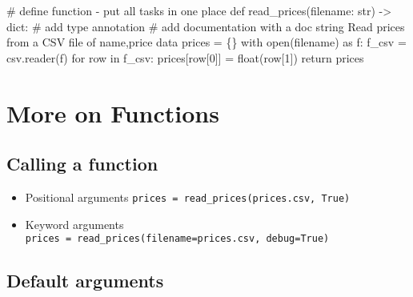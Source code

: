 \documentclass[
  letterpaper,
  DIV=11,
  numbers=noendperiod]{scrreprt}
\newenvironment{Shaded}{\begin{snugshade}}{\end{snugshade}}
\newcommand{\BuiltInTok}[1]{\textcolor[rgb]{0.00,0.46,0.62}{#1}}
\newcommand{\CommentTok}[1]{\textcolor[rgb]{0.37,0.37,0.37}{#1}}
\newcommand{\ControlFlowTok}[1]{\textcolor[rgb]{0.00,0.46,0.62}{#1}}
\newcommand{\DecValTok}[1]{\textcolor[rgb]{0.68,0.00,0.00}{#1}}
\newcommand{\ImportTok}[1]{\textcolor[rgb]{0.00,0.46,0.62}{#1}}
\newcommand{\KeywordTok}[1]{\textcolor[rgb]{0.00,0.46,0.62}{#1}}
\newcommand{\NormalTok}[1]{\textcolor[rgb]{0.00,0.46,0.62}{#1}}
\newcommand{\OperatorTok}[1]{\textcolor[rgb]{0.37,0.37,0.37}{#1}}
\providecommand{\tightlist}{%
  \setlength{\itemsep}{0pt}\setlength{\parskip}{0pt}}
\begin{document}
\begin{Shaded}
\begin{Highlighting}[]
\CommentTok{\# define function {-} put all tasks in one place}
\KeywordTok{def}\NormalTok{ read\_prices(filename: }\BuiltInTok{str}\NormalTok{) }\OperatorTok{{-}\textgreater{}} \BuiltInTok{dict}\NormalTok{: }\CommentTok{\# add type annotation}
    \CommentTok{\# add documentation with a doc string}
    \CommentTok{\textquotesingle{}\textquotesingle{}\textquotesingle{} }
\CommentTok{    Read prices from a CSV file of name,price data}
\CommentTok{    \textquotesingle{}\textquotesingle{}\textquotesingle{}}
\NormalTok{    prices }\OperatorTok{=}\NormalTok{ \{\}}
    \ControlFlowTok{with} \BuiltInTok{open}\NormalTok{(filename) }\ImportTok{as}\NormalTok{ f:}
\NormalTok{        f\_csv }\OperatorTok{=}\NormalTok{ csv.reader(f)}
        \ControlFlowTok{for}\NormalTok{ row }\KeywordTok{in}\NormalTok{ f\_csv:}
\NormalTok{            prices[row[}\DecValTok{0}\NormalTok{]] }\OperatorTok{=} \BuiltInTok{float}\NormalTok{(row[}\DecValTok{1}\NormalTok{])}
    \ControlFlowTok{return}\NormalTok{ prices}
\end{Highlighting}
\end{Shaded}

\hypertarget{more-on-functions}{%
\section{More on Functions}\label{more-on-functions}}

\hypertarget{calling-a-function}{%
\subsection{Calling a function}\label{calling-a-function}}

\begin{itemize}
\tightlist
\item
  Positional arguments
  \texttt{prices\ =\ read\_prices(\textquotesingle{}prices.csv\textquotesingle{},\ True)}
\item
  Keyword arguments
  \texttt{prices\ =\ read\_prices(filename=\textquotesingle{}prices.csv\textquotesingle{},\ debug=True)}
\end{itemize}

\hypertarget{default-arguments}{%
\subsection{Default arguments}\label{default-arguments}}
\end{document}
